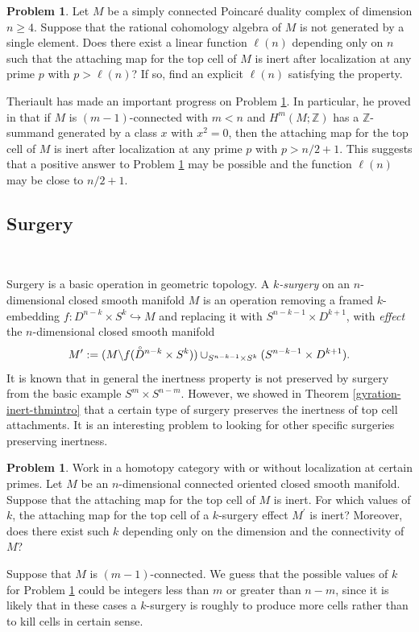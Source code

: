 \documentclass[a4]{amsart}
\theoremstyle{definition}
\newtheorem{problem}[theorem]{Problem}
\begin{document}
\begin{sloppypar}
\begin{problem}\label{HLrefined-prop}
Let $M$ be a simply connected Poincar\'{e} duality complex of dimension $n\geq 4$.
Suppose that the rational cohomology algebra of $M$ is not generated by a single element. Does there exist a linear function $\ell(n)$ depending only on $n$ such that the attaching map for the top cell of $M$ is inert after localization at any prime $p$ with $p>\ell(n)$? If so, find an explicit $\ell(n)$ satisfying the property.  
\end{problem}
Theriault \cite{The24b} has made an important progress on Problem \ref{HLrefined-prop}. In particular, he proved in \cite[Theorems 6.4 and 7.5]{The24b} that if $M$ is $(m-1)$-connected with $m<n$ and $H^m(M;\mathbb{Z})$ has a $\mathbb{Z}$-summand generated by a class $x$ with $x^2=0$, then the attaching map for the top cell of $M$ is inert after localization at any prime $p$ with $p>n/2+1$. This suggests that a positive answer to Problem \ref{HLrefined-prop} may be possible and the function $\ell(n)$ may be close to $n/2+1$. 



\subsection{Surgery}

$\, $

Surgery is a basic operation in geometric topology. A {\it $\mathit{k}$-surgery} on an $n$-dimensional closed smooth manifold $M$ is an operation removing a framed $\mathit{k}$-embedding $f: D^{n-k}\times S^{k}\hookrightarrow  M$ and replacing it with $S^{n-k-1}\times D^{k+1}$, with {\it effect} the $n$-dimensional closed smooth manifold
\[
M^\prime:=(M\backslash f(\accentset{\circ}{D}^{n-k}\times  S^{k}))\cup_{S^{n-k-1}\times S^{k}} (S^{n-k-1}\times D^{k+1}).
\]
It is known that in general the inertness property is not preserved by surgery from the basic example $S^m\times S^{n-m}$. However, we showed in Theorem \ref{gyration-inert-thmintro} that a certain type of surgery preserves the inertness of top cell attachments. It is an interesting problem to looking for other specific surgeries preserving inertness. 

\begin{problem}\label{surgery-prop}
Work in a homotopy category with or without localization at certain primes. Let $M$ be an $n$-dimensional connected oriented closed smooth manifold. Suppose that the attaching map for the top cell of $M$ is inert. For which values of $k$, the attaching map for the top cell of a $k$-surgery effect $M^\prime$ is inert? Moreover, does there exist such $k$ depending only on the dimension and the connectivity of $M$?
\end{problem}
Suppose that $M$ is $(m-1)$-connected. We guess that the possible values of $k$ for Problem \ref{surgery-prop} could be integers less than $m$ or greater than $n-m$, since it is likely that in these cases a $k$-surgery is roughly to produce more cells rather than to kill cells in certain sense. 


\end{sloppypar}
\end{document}
